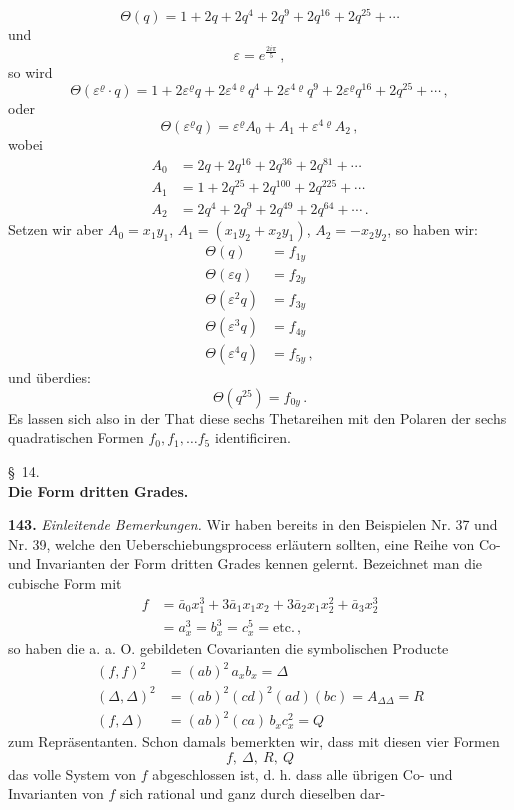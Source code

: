 \documentclass[11pt]{article}
\providecommand{\weberpage}[1]{}
\let\Delta\varDelta
\let\Theta\varTheta
\begin{document}
\weberpage{167}
\[
\Theta(q) = 1 + 2q + 2q^4 + 2q^9 + 2q^{16} + 2q^{25} + \cdots
\]
und
\[
\varepsilon = e^{\frac{2i\pi}{5}}\,,
\]
so wird
\[
\Theta(\varepsilon^\varrho\cdot q) = 1 + 2\varepsilon^\varrho q + 2\varepsilon^{4\varrho}q^4 + 2\varepsilon^{4\varrho}q^9 + 2\varepsilon^\varrho q^{16} + 2q^{25} + \cdots\,,
\]
oder
\[
\Theta(\varepsilon^\varrho q) = \varepsilon^\varrho A_0 + A_1 + \varepsilon^{4\varrho}A_2\,,
\]
wobei
\[
\begin{aligned}
A_0 &= 2q + 2q^{16} + 2q^{36} + 2q^{81} + \cdots \\
A_1 &= 1 + 2q^{25} + 2q^{100} + 2q^{225} + \cdots \\
A_2 &= 2q^4 + 2q^9 + 2q^{49} + 2q^{64} + \cdots\,.
\end{aligned}
\]
Setzen wir aber $A_0 = x_1y_1$, $A_1 = (x_1y_2 + x_2y_1)$, $A_2 = -x_2y_2$, so haben wir:
\[
\begin{aligned}
\Theta(q) &= f_{1y} \\
\Theta(\varepsilon q) &= f_{2y} \\
\Theta(\varepsilon^2 q) &= f_{3y} \\
\Theta(\varepsilon^3 q) &= f_{4y} \\
\Theta(\varepsilon^4 q) &= f_{5y}\,,
\end{aligned}
\]
und überdies:
\[
\Theta(q^{25}) = f_{0y}\,.
\]
Es lassen sich also in der That diese sechs Thetareihen mit den Polaren der sechs quadratischen Formen $f_0, f_1, \dots f_5$ identificiren.

\begin{center}
\S~14.\\[2pt]
\textbf{Die Form dritten Grades.}
\end{center}

\textbf{143.} \textit{Einleitende Bemerkungen.} Wir haben bereits in den Beispielen Nr. 37 und Nr. 39, welche den Ueberschiebungsprocess erläutern sollten, eine Reihe von Co- und Invarianten der Form dritten Grades kennen gelernt. Bezeichnet man die cubische Form mit
\[
\begin{aligned}
f &= \bar a_0 x_1^3 + 3\bar a_1 x_1x_2 + 3\bar a_2 x_1x_2^2 + \bar a_3 x_2^3 \\
&= a_x^3 = b_x^3 = c_x^5 = \text{etc.}\,,
\end{aligned}
\]
so haben die a. a. O. gebildeten Covarianten die symbolischen Producte
\[
\begin{aligned}
(f,f)^2 &= (ab)^2\,a_xb_x = \Delta \\
(\Delta,\Delta)^2 &= (ab)^2(cd)^2(ad)(bc) = A_{\Delta\Delta} = R \\
(f,\Delta) &= (ab)^2(ca)\,b_x c_x^2 = Q
\end{aligned}
\]
zum Repräsentanten. Schon damals bemerkten wir, dass mit diesen vier Formen
\[
f,\ \Delta,\ R,\ Q
\]
das volle System von $f$ abgeschlossen ist, d. h. dass alle übrigen Co- und Invarianten von $f$ sich rational und ganz durch dieselben dar-
\end{document}
